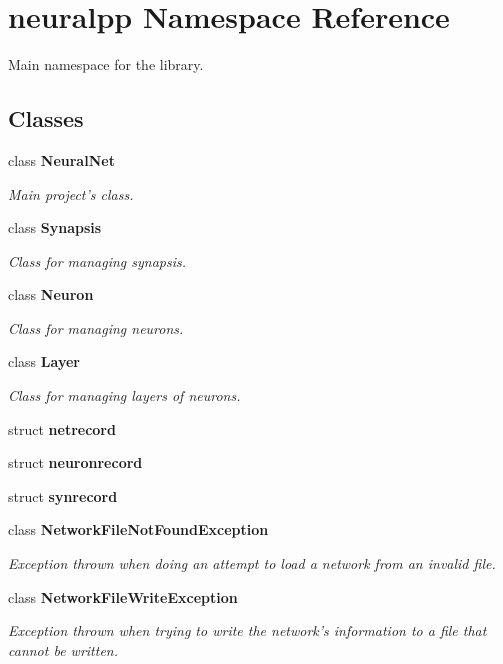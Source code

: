 \section{neuralpp Namespace Reference}
\label{namespaceneuralpp}
Main namespace for the library.  


\subsection*{Classes}
\begin{CompactItemize}
\item 
class {\bf NeuralNet}
\begin{CompactList}\small\item\em Main project's class. \item\end{CompactList}\item 
class {\bf Synapsis}
\begin{CompactList}\small\item\em Class for managing synapsis. \item\end{CompactList}\item 
class {\bf Neuron}
\begin{CompactList}\small\item\em Class for managing neurons. \item\end{CompactList}\item 
class {\bf Layer}
\begin{CompactList}\small\item\em Class for managing layers of neurons. \item\end{CompactList}\item 
struct {\bf netrecord}
\item 
struct {\bf neuronrecord}
\item 
struct {\bf synrecord}
\item 
class {\bf NetworkFileNotFoundException}
\begin{CompactList}\small\item\em Exception thrown when doing an attempt to load a network from an invalid file. \item\end{CompactList}\item 
class {\bf NetworkFileWriteException}
\begin{CompactList}\small\item\em Exception thrown when trying to write the network's information to a file that cannot be written. \item\end{CompactList}\item 

\end{CompactItemize}
